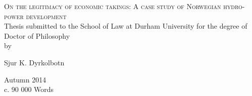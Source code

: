 \begin{titlepage}

\begin{center}



\vspace*{\fill}
\centering

{\Huge\textsc{On the legitimacy of economic takings: A case study of Norwegian hydro-power development}}\\[3cm]

\large {Thesis submitted to the School of Law at Durham University for the degree of Doctor of Philosophy}\\

by

{Sjur K. Dyrkolbotn}\\

\vspace*{\fill}

 

\vfill

{\Large Autumn 2014}\\
{c. 90 000 Words}

\end{center}

\end{titlepage}
